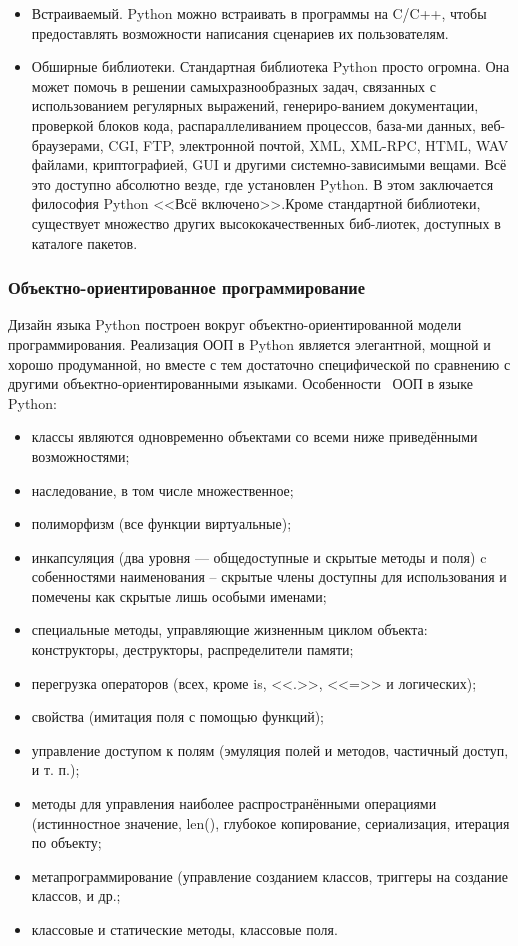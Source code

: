 \begin{itemize}
  \item Встраиваемый. Python можно встраивать в программы на C/C++, чтобы предоставлять возможности написания сценариев их пользователям.
  \item Обширные библиотеки. Стандартная библиотека Python просто огромна. Она может помочь в решении самыхразнообразных задач, связанных с использованием регулярных выражений, генериро-ванием документации, проверкой блоков кода, распараллеливанием процессов, база-ми данных, веб-браузерами, CGI, FTP, электронной почтой, XML, XML-RPC, HTML, WAV файлами, криптографией, GUI и другими системно-зависимыми вещами. Всё это доступно абсолютно везде, где установлен Python. В этом заключается философия Python <<Всё включено>>.Кроме стандартной библиотеки, существует множество других высококачественных биб-лиотек, доступных в каталоге пакетов.
\end{itemize}

\subsubsection{Объектно-ориентированное программирование}
Дизайн языка Python построен вокруг объектно-ориентированной модели программирования. Реализация ООП в Python является элегантной, мощной и хорошо продуманной, но вместе с тем достаточно специфической по сравнению с другими объектно-ориентированными языками. Особенности~\cite{wiki_python, byte_of_python} ООП в языке Python:
\begin{itemize}
\item классы являются одновременно объектами со всеми ниже приведёнными возможностями;
\item наследование, в том числе множественное;
\item полиморфизм (все функции виртуальные);
\item инкапсуляция (два уровня — общедоступные и скрытые методы и поля) c собенностями наименования -- скрытые члены доступны для использования и помечены как скрытые лишь особыми именами;
\item специальные методы, управляющие жизненным циклом объекта: конструкторы, деструкторы, распределители памяти;
\item перегрузка операторов (всех, кроме is, <<.>>, <<=>> и логических);
\item свойства (имитация поля с помощью функций);
\item управление доступом к полям (эмуляция полей и методов, частичный доступ, и т. п.);
\item методы для управления наиболее распространёнными операциями (истинностное значение, len(), глубокое копирование, сериализация, итерация по объекту;
\item метапрограммирование (управление созданием классов, триггеры на создание классов, и др.;
\item классовые и статические методы, классовые поля.
\end{itemize}

